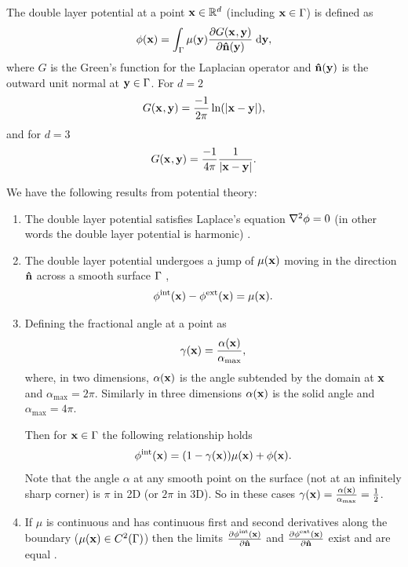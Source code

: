 The double layer potential at a point $\boldsymbol{\mathrm{x}} \in \mathbb{R}^d$ (including $\boldsymbol{\mathrm{x}} \in {\Gamma}$) is defined as
\begin{equation}
  \label{eq:3}
  \phi(\boldsymbol{\mathrm{x}}) = \int_{{\Gamma}} \mu(\boldsymbol{\mathrm{y}}) \frac{\partial G(\boldsymbol{\mathrm{x}}_{},\boldsymbol{\mathrm{y}})}{\partial \boldsymbol{\mathrm{\hat{n}}}(\boldsymbol{\mathrm{y}})} {\; \mathrm{{d}}} \boldsymbol{\mathrm{y}},
\end{equation}
where $G$ is the Green's function for the Laplacian operator and $\boldsymbol{\mathrm{\hat{n}}}(\boldsymbol{\mathrm{y}})$ is the outward unit normal at $\boldsymbol{\mathrm{y}} \in {\Gamma}$.
For $d=2$
\begin{equation}
  G(\boldsymbol{\mathrm{x}}_{},\boldsymbol{\mathrm{y}}) = \dfrac{-1}{2\pi}\ln(\left|{\boldsymbol{\mathrm{x}} - \boldsymbol{\mathrm{y}}} \right|),
  \label{eqn:greenslaplacian2d}
\end{equation}
and for $d=3$
\begin{equation}
  G(\boldsymbol{\mathrm{x}}_{},\boldsymbol{\mathrm{y}}) = \dfrac{-1}{4 \pi} \dfrac{1}{\left|{\boldsymbol{\mathrm{x}} - \boldsymbol{\mathrm{y}}} \right|}.
  \label{eqn:greenslaplacian3d}
\end{equation}


We have the following results from potential theory:
\begin{enumerate}
\item The double layer potential satisfies Laplace's equation $\nabla^2 \phi = 0$ (in other words the double layer potential is harmonic) \cite{Sternberg1946}.

\item The double layer potential undergoes a jump of $\mu(\boldsymbol{\mathrm{x}})$ moving in the direction $\boldsymbol{\mathrm{\hat{n}}}$ across a smooth surface ${\Gamma}$ \cite[136-140]{Sternberg1946}, \ie
  \begin{equation}
    \label{eq:15}
    \phi^{\mathrm{int}}(\boldsymbol{\mathrm{x}}) - \phi^{\mathrm{ext}}(\boldsymbol{\mathrm{x}}) = \mu(\boldsymbol{\mathrm{x}}).
  \end{equation}

\item Defining the fractional angle at a point as
  \begin{equation}
    \gamma(\boldsymbol{\mathrm{x}}) = \frac{\alpha(\boldsymbol{\mathrm{x}})}{\alpha_{\text{max}}},
  \end{equation}
  where, in two dimensions, $\alpha(\boldsymbol{\mathrm{x}})$ is the angle subtended by the domain at $\boldsymbol{\mathrm{x}}$ and $\alpha_{\text{max}} = 2\pi$.
  Similarly in three dimensions $\alpha(\boldsymbol{\mathrm{x}})$ is the solid angle and $\alpha_{\text{max}} = 4\pi$.

  Then for $\boldsymbol{\mathrm{x}} \in {\Gamma}$ the following relationship holds \cite[137-139, 155]{Sternberg1946}
  \begin{equation}
    \phi^{\mathrm{int}}(\boldsymbol{\mathrm{x}}) = (1 - \gamma(\boldsymbol{\mathrm{x}})) \mu(\boldsymbol{\mathrm{x}}) + \phi(\boldsymbol{\mathrm{x}}).
    \label{eq:22}
  \end{equation}
  Note that the angle $\alpha$ at any smooth point on the surface (\ie not at an infinitely sharp corner) is $\pi$ in 2D (or $2\pi$ in 3D).
  So in these cases $\gamma(\boldsymbol{\mathrm{x}}) = \frac{\alpha(\boldsymbol{\mathrm{x}})}{\alpha_{\text{max}}} = \frac{1}{2}$.

\item If $\mu$ is continuous and has continuous first and second derivatives along the boundary (\ie $\mu(\boldsymbol{\mathrm{x}}) \in C^2({\Gamma})$) then the limits $\frac{\partial \phi^{\mathrm{int}}(\boldsymbol{\mathrm{x}})}{\partial \boldsymbol{\mathrm{\hat{n}}}}$ and $\frac{\partial \phi^{\mathrm{ext}}(\boldsymbol{\mathrm{x}})}{\partial \boldsymbol{\mathrm{\hat{n}}}}$ exist and are equal \cite[145-153]{Sternberg1946}.

\end{enumerate}


